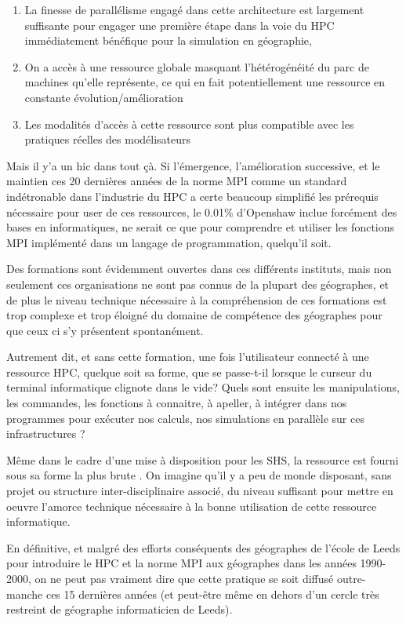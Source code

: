 \begin{enumerate}[label=(\alph*),labelindent=\parindent,leftmargin=*]
\item La finesse de parallélisme engagé dans cette architecture est largement suffisante pour engager une première étape dans la voie du HPC immédiatement bénéfique pour la simulation en géographie,
\item On a accès à une ressource globale masquant l'hétérogénéité du parc de machines qu'elle représente, ce qui en fait potentiellement une ressource en constante évolution/amélioration
\item Les modalités d'accès à cette ressource sont plus compatible avec les pratiques réelles des modélisateurs
\end{enumerate}

Mais il y'a un hic dans tout çà. Si l'émergence, l'amélioration successive, et le maintien ces 20 dernières années de la norme MPI comme un standard indétronable dans l'industrie du HPC a certe beaucoup simplifié les prérequis nécessaire pour user de ces ressources, le 0.01\% d'Openshaw inclue forcément des bases en informatiques, ne serait ce que pour comprendre et utiliser les fonctions MPI implémenté dans un langage de programmation, quelqu'il soit.

Des formations sont évidemment ouvertes dans ces différents instituts, mais non seulement ces organisations ne sont pas connus de la plupart des géographes, et de plus le niveau technique nécessaire à la compréhension de ces formations est trop complexe et trop éloigné du domaine de compétence des géographes pour que ceux ci s'y présentent spontanément.

Autrement dit, et sans cette formation, une fois l'utilisateur connecté à une ressource HPC, quelque soit sa forme, que se passe-t-il lorsque le curseur du terminal informatique clignote dans le vide? Quels sont ensuite les manipulations, les commandes, les fonctions à connaitre, à apeller, à intégrer dans nos programmes pour exécuter nos calculs, nos simulations en parallèle sur ces infrastructures ?

Même dans le cadre d'une mise à disposition pour les SHS, la ressource est fourni sous sa forme la plus brute . On imagine qu'il y a peu de monde disposant, sans projet ou structure inter-disciplinaire associé, du niveau suffisant pour mettre en oeuvre l'amorce technique nécessaire à la bonne utilisation de cette ressource informatique.

En définitive, et malgré des efforts conséquents des géographes de l'école de Leeds \autocite{Openshaw2000} pour introduire le HPC et la norme MPI aux géographes dans les années 1990-2000, on ne peut pas vraiment dire que cette pratique se soit diffusé outre-manche ces 15 dernières années (et peut-être même en dehors d'un cercle très restreint de géographe informaticien de Leeds).

